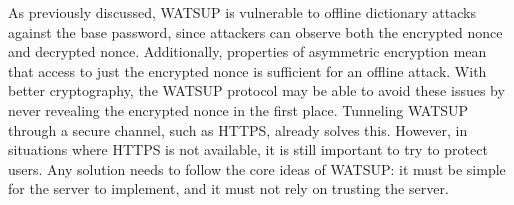 As previously discussed, WATSUP is vulnerable to offline dictionary attacks against the base password, since attackers can observe both the encrypted nonce and decrypted nonce. Additionally, properties of asymmetric encryption mean that access to just the encrypted nonce is sufficient for an offline attack. With better cryptography, the WATSUP protocol may be able to avoid these issues by never revealing the encrypted nonce in the first place. Tunneling WATSUP through a secure channel, such as HTTPS, already solves this. However, in situations where HTTPS is not available, it is still important to try to protect users. Any solution needs to follow the core ideas of WATSUP: it must be simple for the server to implement, and it must not rely on trusting the server.